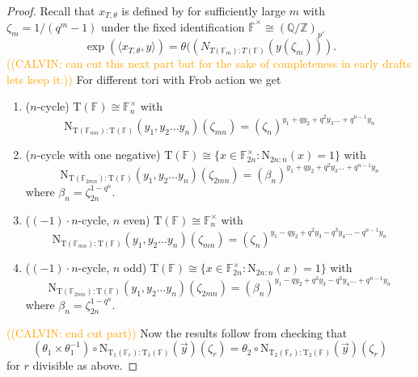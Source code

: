 \documentclass[12pt, reqno]{amsart}
\theoremstyle{definition}
\theoremstyle{definition}
\theoremstyle{definition}
\newcommand{\multiplicativegroup}[1]{#1^{\times}}
\newcommand{\FieldNorm}[2]{\mathrm{N}_{#1:#2}}
\newcommand{\finiteField}{\mathbb{F}}
\newcommand{\algebraicClosure}[1]{\overline{#1}}
\newcommand{\algebraicGroup}[1]{\boldsymbol{\mathrm{#1}}}
\newcommand{\calvin}[1]{\textcolor{orange}{\sffamily ((CALVIN: #1))}}
\begin{document}
\begin{proof}
Recall that $x_{T,\theta}$ is defined by for sufficiently large $m$ with $\zeta_m = 1/(q^m-1)$ under the fixed identification $\multiplicativegroup{\algebraicClosure{\finiteField}} \cong (\mathbb{Q}/\mathbb{Z})_{p'}$
\[
    \exp(\langle x_{T,\theta},y\rangle) = \theta((N_{T(\finiteField_m):T(\finiteField)}(y(\zeta_m))).
\]
\calvin{can cut this next part but for the sake of completeness in early drafts lets keep it:}
For different tori with Frob action we get
\begin{enumerate}
    \item ($n$-cycle) $\algebraicGroup{T}(\finiteField) \cong \finiteField_n^\times$ with $$\FieldNorm{\algebraicGroup{T}(\finiteField_{mn})}{\algebraicGroup{T}(\finiteField)}(y_1,y_2 \hdots y_n)(\zeta_{mn}) = (\zeta_n)^{y_1+qy_2+q^2y_3 \hdots +q^{n-1}y_n}$$
    \item ($n$-cycle with one negative) $\algebraicGroup{T}(\finiteField) \cong \{x \in \finiteField_{2n}^\times: \FieldNorm{2n}{n}(x) = 1\}$ with $$\FieldNorm{\algebraicGroup{T}(\finiteField_{2mn})}{\algebraicGroup{T}(\finiteField)}(y_1,y_2 \hdots y_n)(\zeta_{2mn}) = (\beta_n)^{y_1+qy_2+q^2y_3 \hdots +q^{n-1}y_n}$$
    where $\beta_n = \zeta_{2n}^{1-q^n}$.
    \item ($(-1) \cdot n$-cycle, $n$ even) $\algebraicGroup{T}(\finiteField) \cong \finiteField_n^\times$ with $$\FieldNorm{\algebraicGroup{T}(\finiteField_{mn})}{\algebraicGroup{T}(\finiteField)}(y_1,y_2 \hdots y_n)(\zeta_{mn}) = (\zeta_n)^{y_1-qy_2+q^2y_3-q^3y_4 \hdots -q^{n-1}y_n}$$
    \item ($(-1) \cdot n$-cycle, $n$ odd) $\algebraicGroup{T}(\finiteField) \cong \{x \in \finiteField_{2n}^\times: \FieldNorm{2n}{n}(x) = 1\}$ with $$\FieldNorm{\algebraicGroup{T}(\finiteField_{2mn})}{\algebraicGroup{T}(\finiteField)}(y_1,y_2 \hdots y_n)(\zeta_{2mn}) = (\beta_n)^{y_1-qy_2+q^2y_3-q^3y_4 \hdots +q^{n-1}y_n}$$
    where $\beta_n = \zeta_{2n}^{1-q^n}$.
\end{enumerate}
\calvin{end cut part}
Now the results follow from checking that
\[
    (\theta_1 \times \theta_1^{-1}) \circ \FieldNorm{\algebraicGroup{T}_1(\finiteField_r)}{\algebraicGroup{T}_1(\finiteField)} (\vec{y})(\zeta_r) = \theta_2\circ \FieldNorm{\algebraicGroup{T}_2(\finiteField_r)}{\algebraicGroup{T}_2(\finiteField)}(\vec{y})(\zeta_r)
\]
for $r$ divisible as above.
\begin{comment}
Thus the result follows from the computations:
\begin{enumerate}
	\item[B,C,D Case 1] \begin{align*}

\end{comment}
\end{proof}
\end{document}
